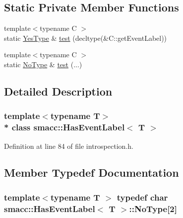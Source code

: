 \subsection*{Static Private Member Functions}
\begin{DoxyCompactItemize}
\item 
{\footnotesize template$<$typename C $>$ }\\static \hyperlink{classsmacc_1_1HasEventLabel_a7baf4f99540d64553d8bba388b77fb25}{Yes\+Type} \& \hyperlink{classsmacc_1_1HasEventLabel_a346a72be8e0086abda1883e85e6f2d5d}{test} (decltype(\&C\+::get\+Event\+Label))
\item 
{\footnotesize template$<$typename C $>$ }\\static \hyperlink{classsmacc_1_1HasEventLabel_a95929e58f14e06acf98ddcb5dec21f6b}{No\+Type} \& \hyperlink{classsmacc_1_1HasEventLabel_a723ffed00dc749921201a23607a90964}{test} (...)
\end{DoxyCompactItemize}


\subsection{Detailed Description}
\subsubsection*{template$<$typename T$>$\\*
class smacc\+::\+Has\+Event\+Label$<$ T $>$}



Definition at line 84 of file introspection.\+h.



\subsection{Member Typedef Documentation}
\subsubsection[{\texorpdfstring{No\+Type}{NoType}}]{\setlength{\rightskip}{0pt plus 5cm}template$<$typename T $>$ typedef char {\bf smacc\+::\+Has\+Event\+Label}$<$ T $>$\+::No\+Type\mbox{[}2\mbox{]}\hspace{0.3cm}{\ttfamily [private]}}\hypertarget{classsmacc_1_1HasEventLabel_a95929e58f14e06acf98ddcb5dec21f6b}{}\label{classsmacc_1_1HasEventLabel_a95929e58f14e06acf98ddcb5dec21f6b}


